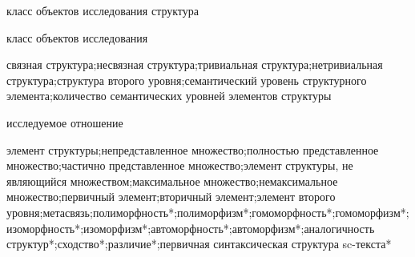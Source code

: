 \begin{SCn}
\scnsectionheader{\currentname}
\begin{scnsubstruct}
\begin{scnhaselementrole}{класс объектов исследования}
структура\end{scnhaselementrole}
\begin{scnhaselementrolelist}{класс объектов исследования}

связная структура;несвязная структура;тривиальная структура;нетривиальная структура;структура второго уровня;семантический уровень структурного элемента;количество семантических уровней элементов структуры

\end{scnhaselementrolelist}
\begin{scnhaselementrolelist}{исследуемое отношение}

элемент структуры\scnrolesign;непредставленное множество\scnrolesign;полностью представленное множество\scnrolesign;частично представленное множество\scnrolesign;элемент структуры, не являющийся множеством\scnrolesign;максимальное множество\scnrolesign;немаксимальное множество\scnrolesign;первичный элемент\scnrolesign;вторичный элемент\scnrolesign;элемент второго уровня\scnrolesign;метасвязь\scnrolesign;полиморфность*;полиморфизм*;гомоморфность*;гомоморфизм*;изоморфность*;изоморфизм*;автоморфность*;автоморфизм*;аналогичность структур*;сходство*;различие*;первичная синтаксическая структура sc-текста*

\end{scnhaselementrolelist}
\begin{scnsubdividing}


\end{scnsubdividing}
\begin{scnsubdividing}


\end{scnsubdividing}
\begin{scnsubdividing}



\end{scnsubdividing}
\end{scnsubstruct}
\end{SCn}
